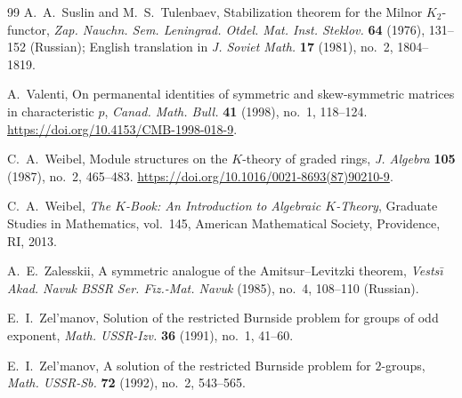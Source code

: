 \begin{thebibliography}{99}
A.~A.~Suslin and M.~S.~Tulenbaev,
Stabilization theorem for the Milnor $K_2$-functor,
\emph{Zap. Nauchn. Sem. Leningrad. Otdel. Mat. Inst. Steklov.} \textbf{64} (1976), 131--152 (Russian);
English translation in \emph{J. Soviet Math.} \textbf{17} (1981), no.~2, 1804--1819.

A.~Valenti,
On permanental identities of symmetric and skew-symmetric matrices in characteristic $p$,
\emph{Canad. Math. Bull.} \textbf{41} (1998), no.~1, 118--124.
\url{https://doi.org/10.4153/CMB-1998-018-9}.

C.~A.~Weibel,
Module structures on the $K$-theory of graded rings,
\emph{J. Algebra} \textbf{105} (1987), no.~2, 465--483.
\url{https://doi.org/10.1016/0021-8693(87)90210-9}.

C.~A.~Weibel,
\emph{The $K$-Book: An Introduction to Algebraic $K$-Theory},
Graduate Studies in Mathematics, vol.~145,
American Mathematical Society, Providence, RI, 2013.

A.~E.~Zalesskii,
A symmetric analogue of the Amitsur--Levitzki theorem,
\emph{Vests\={\i} Akad. Navuk BSSR Ser. F\={\i}z.-Mat. Navuk} (1985), no.~4, 108--110 (Russian).

E.~I.~Zel'manov,
Solution of the restricted Burnside problem for groups of odd exponent,
\emph{Math. USSR-Izv.} \textbf{36} (1991), no.~1, 41--60.

E.~I.~Zel'manov,
A solution of the restricted Burnside problem for $2$-groups,
\emph{Math. USSR-Sb.} \textbf{72} (1992), no.~2, 543--565.

\end{thebibliography}
